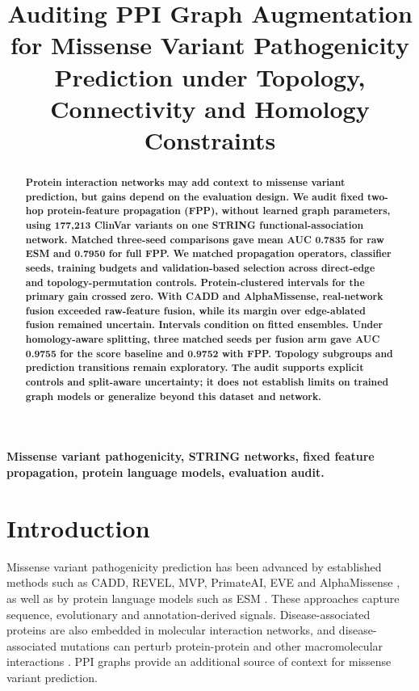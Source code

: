 \documentclass[conference]{IEEEtran}
\title{Auditing PPI Graph Augmentation for Missense Variant Pathogenicity Prediction under Topology, Connectivity and Homology Constraints}
\author{}
\begin{document}
\maketitle


\begin{abstract}
\bfseries\boldmath
Protein interaction networks may add context to missense variant prediction, but gains depend on the evaluation design. We audit fixed two-hop protein-feature propagation (FPP), without learned graph parameters, using 177,213 ClinVar variants on one STRING functional-association network. Matched three-seed comparisons gave mean AUC 0.7835 for raw ESM and 0.7950 for full FPP. We matched propagation operators, classifier seeds, training budgets and validation-based selection across direct-edge and topology-permutation controls. Protein-clustered intervals for the primary gain crossed zero. With CADD and AlphaMissense, real-network fusion exceeded raw-feature fusion, while its margin over edge-ablated fusion remained uncertain. Intervals condition on fitted ensembles. Under homology-aware splitting, three matched seeds per fusion arm gave AUC 0.9755 for the score baseline and 0.9752 with FPP. Topology subgroups and prediction transitions remain exploratory. The audit supports explicit controls and split-aware uncertainty; it does not establish limits on trained graph models or generalize beyond this dataset and network.

\end{abstract}

\begin{IEEEkeywords}
\bfseries\boldmath
Missense variant pathogenicity, STRING networks, fixed feature propagation, protein language models, evaluation audit.
\end{IEEEkeywords}

\section{Introduction}

Missense variant pathogenicity prediction has been advanced by established methods such as CADD, REVEL, MVP, PrimateAI, EVE and AlphaMissense \cite{Kircher2014CADD,Ioannidis2016REVEL,Qi2021MVP,Sundaram2018PrimateAI,Frazer2021EVE,Cheng2023AlphaMissense}, as well as by protein language models such as ESM \cite{Lin2023ESM}. These approaches capture sequence, evolutionary and annotation-derived signals. Disease-associated proteins are also embedded in molecular interaction networks, and disease-associated mutations can perturb protein-protein and other macromolecular interactions \cite{Barabasi2011NetworkMedicine,Menche2015DiseaseModules,Sahni2015InteractionPerturbation,Chen2018InteractomePerturbation}. PPI graphs provide an additional source of context for missense variant prediction.
\end{document}
